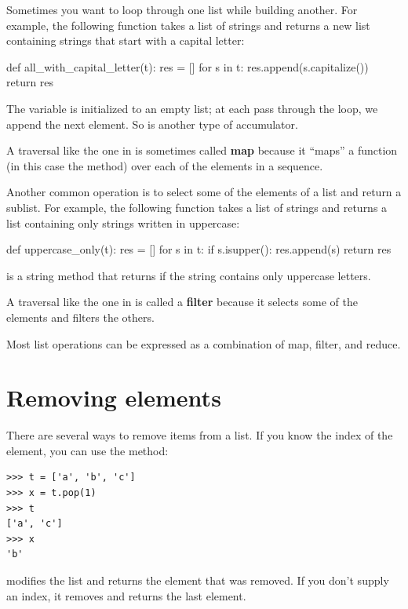 Sometimes you want to loop through one list while building another. For example, the following function takes a list of strings and returns a new list containing strings that start with a capital letter:

\begin{python}[frame=single]
def all_with_capital_letter(t):
    res = []
    for s in t:
        res.append(s.capitalize())
    return res
\end{python}
%
The variable  is initialized to an empty list; at each pass through the loop, we append the next element. So  is another type of accumulator.

A traversal like the one in  is sometimes called \textbf{map} because it ``maps'' a function (in this case the  method) over each of the elements in a sequence.

Another common operation is to select some of the elements of a list and return a sublist. For example, the following function takes a list of strings and returns a list containing only strings written in uppercase:

\begin{python}[frame=single]
def uppercase_only(t):
    res = []
    for s in t:
        if s.isupper():
            res.append(s)
    return res
\end{python}
%
 is a string method that returns  if the string contains only uppercase letters.

A traversal like the one in  is called a \textbf{filter} because it selects some of the elements and filters the others.

Most list operations can be expressed as a combination of map, filter, and reduce.


\section{Removing elements}

There are several ways to remove items from a list. If you know the index of the element, you can use the  method:

\begin{Verbatim}[frame=single]
>>> t = ['a', 'b', 'c']
>>> x = t.pop(1)
>>> t
['a', 'c']
>>> x
'b'
\end{Verbatim}
%
 modifies the list and returns the element that was removed.
If you don't supply an index, it removes and returns the last element.

